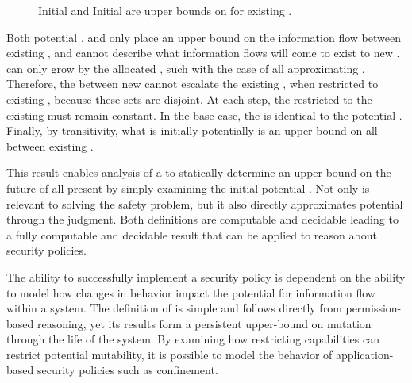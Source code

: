 \begin{figure}
\COQDOCmutablePotAccExecuteApprox %
\COQDOCmutableApproxMutated %
\caption{Initial \TMpotAccMutability{} and Initial \TMmutability{} are upper bounds on \TMmutation{} for existing \TMobjs{}. \label{fig:flow:mutableApproxMutated}}
\end{figure}

Both potential \TMmutability{}, and \TMmutablePotAccExecute{} only place an upper bound on the information flow between existing \TMobjs{}, and cannot describe what information flows will come to exist to new \TMobjs{}.
\xmakefirstuc{\TMmutablePotAccExecute} can only grow by the allocated \TMobj{}, such with the case of all \TMpotAcc{} approximating \TMops{}.
Therefore, the \TMmutablePotAccExecute{} between new \TMobjs{} cannot escalate the existing \TMmutablePotAccExecute{}, when restricted to existing \TMobjs{}, because these sets are disjoint.
At each step, the \TMmutablePotAccExecute{} restricted to the existing \TMobjs{} must remain constant.
In the base case, the \TMmutablePotAccExecute{} is identical to the potential \TMmutability{}.
Finally, by transitivity, what is initially potentially \TMmutable{} is an upper bound on all \TMmutation{} between existing \TMobjs{}.

This result enables analysis of a \TMsystemState{} to statically determine an upper bound on the future \TMmutability{} of all \TMsubsystems{} present by simply examining the initial potential \TMmutability{}.
Not only is \TMpotAcc{} relevant to solving the safety problem, but it also directly approximates potential \TMmutation{} through the \COQmutable{} judgment.
Both definitions are computable and decidable leading to a fully computable and decidable result that can be applied to reason about security policies.

The ability to successfully implement a security policy is dependent on the ability to model how changes in behavior impact the potential for information flow within a system.
The definition of \COQmutable{} is simple and follows directly from permission-based reasoning, yet its results form a persistent upper-bound on mutation through the life of the system.
By examining how restricting capabilities can restrict potential mutability, it is possible to model the behavior of application-based security policies such as confinement.
